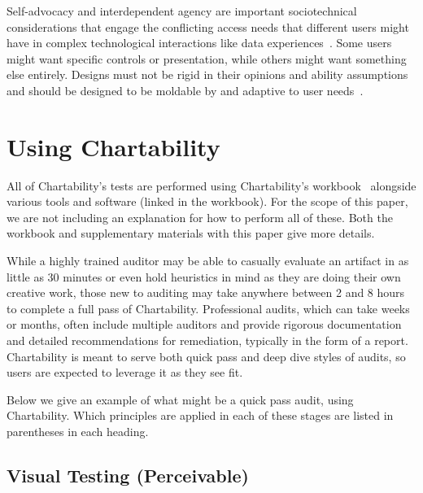 \documentclass{egpubl}
\begin{document}
Self-advocacy and interdependent agency are important sociotechnical considerations that engage the conflicting access needs that different users might have in complex technological interactions like data experiences~\cite{bennett_interdependence_2018, mankoff_disability_2010}. Some users might want specific controls or presentation, while others might want something else entirely. Designs must not be rigid in their opinions and ability assumptions and should be designed to be moldable by and adaptive to user needs~\cite{wobbrock_ability-based_2011, ladner_design_2015}. 

\section{Using Chartability}

All of Chartability's tests are performed using Chartability's workbook~\cite{noauthor_chartability_nodate} alongside various tools and software (linked in the workbook). For the scope of this paper, we are not including an explanation for how to perform all of these. Both the workbook and supplementary materials with this paper give more details. 

While a highly trained auditor may be able to casually evaluate an artifact in as little as 30 minutes or even hold heuristics in mind as they are doing their own creative work, those new to auditing may take anywhere between 2 and 8 hours to complete a full pass of Chartability. Professional audits, which can take weeks or months, often include multiple auditors and provide rigorous documentation and detailed recommendations for remediation, typically in the form of a report. Chartability is meant to serve both quick pass and deep dive styles of audits, so users are expected to leverage it as they see fit. 

Below we give an example of what might be a quick pass audit, using Chartability. Which principles are applied in each of these stages are listed in parentheses in each heading. 

\subsection{Visual Testing (Perceivable)}
\end{document}
